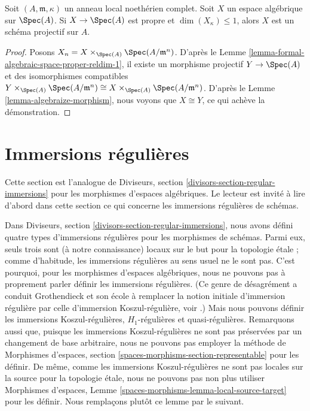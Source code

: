 \begin{lemma}
\label{lemma-projective-over-complete}
Soit $(A, \mathfrak m, \kappa)$ un anneau local noethérien complet.
Soit $X$ un espace algébrique sur $\Spec(A)$.
Si $X \to \Spec(A)$ est propre et $\dim(X_\kappa) \leq 1$, alors
$X$ est un schéma projectif sur $A$.
\end{lemma}

\begin{proof}
Posons $X_n = X \times_{\Spec(A)} \Spec(A/\mathfrak m^n)$.
D'après le Lemme \ref{lemma-formal-algebraic-space-proper-reldim-1},
il existe un morphisme projectif $Y \to \Spec(A)$
et des isomorphismes compatibles
$Y \times_{\Spec(A)} \Spec(A/\mathfrak m^n) \cong
X \times_{\Spec(A)} \Spec(A/\mathfrak m^n)$.
D'après le Lemme \ref{lemma-algebraize-morphism},
nous voyons que $X \cong Y$, ce qui achève la démonstration.
\end{proof}










\section{Immersions régulières}
\label{section-regular-immersions}

\noindent
Cette section est l'analogue de
Diviseurs, section \ref{divisors-section-regular-immersions}
pour les morphismes d'espaces algébriques. Le lecteur est invité à lire d'abord
dans cette section ce qui concerne les immersions régulières de schémas.

\medskip\noindent
Dans
Diviseurs, section \ref{divisors-section-regular-immersions},
nous avons défini quatre types d'immersions régulières pour les morphismes de schémas.
Parmi eux, seuls trois sont (à notre connaissance) locaux sur le but pour
la topologie étale ; comme d'habitude, les immersions régulières au sens usuel ne le sont pas.
C'est pourquoi, pour les morphismes d'espaces algébriques, nous ne pouvons pas à proprement parler définir
les immersions régulières. (Ce genre de désagrément a conduit Grothendieck
et son école à remplacer la notion initiale d'immersion régulière par celle
d'immersion Koszul-régulière, voir
\cite[Exposé VII, définition 1.4]{SGA6}.)
Mais nous pouvons définir les immersions Koszul-régulières, $H_1$-régulières et quasi-régulières.
Remarquons aussi que, puisque les immersions Koszul-régulières ne sont pas préservées par
un changement de base arbitraire, nous ne pouvons pas employer la méthode de
Morphismes d'espaces, section \ref{spaces-morphisms-section-representable}
pour les définir. De même, comme les immersions Koszul-régulières ne sont pas locales
sur la source pour la topologie étale, nous ne pouvons pas non plus utiliser
Morphismes d'espaces, Lemme \ref{spaces-morphisms-lemma-local-source-target}
pour les définir. Nous remplaçons plutôt ce lemme par le
suivant.

